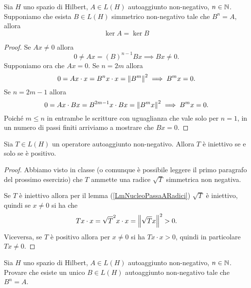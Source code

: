 \documentclass[a4paper]{article}
\begin{document}

\begin{lemma}[]\label{LmNucleoPassaARadici}
Sia $H$ uno spazio di Hilbert, $A\in L(H)$ autoaggiunto non-negativo, $n\in\mathbb{N}$. Supponiamo che esista $B\in L(H)$ simmetrico non-negativo tale che $B^n=A$, allora
\[\ker A=\ker B\]
\end{lemma}
\begin{proof}
Se $Ax\neq 0$ allora
\[0\neq Ax=(B)^{n-1}Bx\implies Bx\neq 0.\]
Supponiamo ora che $Ax=0$. Se $n=2m$ allora
\[0=Ax\cdot x=B^nx\cdot x=\left\Vert{B^m}\right\Vert^2\implies B^mx=0.\]
Se $n=2m-1$ allora
\[0=Ax\cdot Bx=B^{2m-1}x\cdot Bx=\left\Vert{B^m x}\right\Vert^2\implies B^mx=0.\]
Poich\'e $m\leq n$ in entrambe le scritture con uguaglianza che vale solo per $n=1$, in un numero di passi finiti arriviamo a mostrare che $Bx=0$.
\end{proof}
\begin{lemma}[]\label{LmOperatoreSimmetricoNonNegativoIniettivoSSEPositivo}
Sia $T\in L(H)$ un operatore autoaggiunto non-negativo. Allora $T$ \`e iniettivo se e solo se \`e positivo.
\end{lemma}
\begin{proof}
Abbiamo visto in classe (o comunque \`e possibile leggere il primo paragrafo del prossimo esercizio) che $T$ ammette una radice $\sqrt T$ simmetrica non negativa.

Se $T$ \`e iniettivo allora per il lemma (\ref{LmNucleoPassaARadici}) $\sqrt T$ \`e iniettivo, quindi se $x\neq 0$ si ha che
\[Tx\cdot x=\sqrt T^2x\cdot x=\left\Vert{\sqrt Tx}\right\Vert^2>0.\]
Viceversa, se $T$ \`e positivo allora per $x\neq 0$ si ha $Tx\cdot x>0$, quindi in particolare $Tx\neq 0$.
\end{proof}
\begin{exercise}
Sia $H$ uno spazio di Hilbert, $A\in L(H)$ autoaggiunto non-negativo, $n\in\mathbb{N}$. Provare che esiste un unico $B\in L(H)$ autoaggiunto non-negativo tale che $B^n=A$.
\end{exercise}
\end{document}
